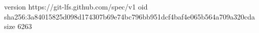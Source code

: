 version https://git-lfs.github.com/spec/v1
oid sha256:3a84015825d098d174307b69e74bc796bb951dcf4baf4e065b564a709a320cda
size 6263
